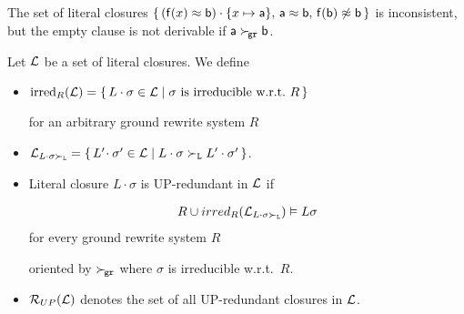            \begin{example}
        The set of literal closures
       \( \{ \,
        (\mathsf{f}(x)\approx\mathsf{b})\cdot \{ x\mapsto\mathsf{a} \}, \,
       \mathsf{a}\approx \mathsf{b}, \,
       \mathsf{f}(\mathsf{b})\not\approx\mathsf{b} \,
       \} \) is inconsistent,
        but the empty clause is not derivable
        if \( \mathsf{a}\mathrel\succ_{\!\mathtt{gr}}\mathsf{b} \).
           \end{example}






   \begin{definition}[UP-Redundancy]
        Let \( \mathcal{L} \) be a set of literal closures. We define
       \begin{itemize}
           \item \( \operatorname{irred}_R(\mathcal{L}) =
           \{ \,
            L\cdot\sigma\in\mathcal{L} \mid
           \sigma\text{ is irreducible w.r.t.~}R
           \, \} \)

        for an arbitrary ground rewrite system \( R \)

       \item
       \(
       \mathcal{L}_{L\cdot\sigma\mathrel\succ_{\mathtt{L}}} =
       \{ \,
        L'\!\cdot\sigma'\in\mathcal{L} \mid
        L\cdot\sigma\mathrel\succ_{\mathtt{L}} L'\cdot\sigma'
       \, \}
         \).

       \item Literal closure \( L\cdot\sigma \) is UP-redundant in \( \mathcal{L} \) if

       \begin{gather*}
            R \cup irred_R(\mathcal{L}_{L\cdot\sigma\mathrel\succ_{\mathtt{L}}}) \vDash L\sigma
       \end{gather*}
        for every ground rewrite system \( R \)

        oriented by \( \mathrel\succ_{\!\mathtt{gr}} \)
        where \( \sigma \) is irreducible w.r.t.~\( R \).

       \item
       \( \mathcal{R}_{UP}(\mathcal{L}) \) denotes the set of all UP-redundant closures in \( \mathcal{L} \).
   \end{itemize}
\end{definition}

